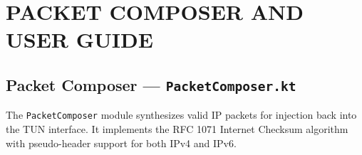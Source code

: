 
\chapter{PACKET COMPOSER AND USER GUIDE}
\label{app:composer_guide}

\section{Packet Composer --- \texttt{PacketComposer.kt}}
\label{app:packetcomposer}

The \texttt{PacketComposer} module synthesizes valid IP packets for injection back into the TUN interface. It implements the RFC 1071 Internet Checksum algorithm with pseudo-header support for both IPv4 and IPv6.

